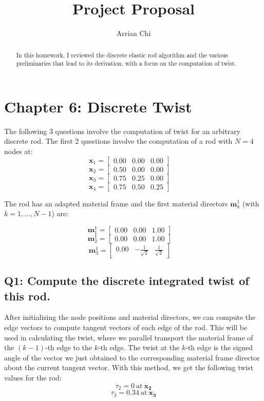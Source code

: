 \documentclass[letterpaper, 10 pt, conference]{ieeeconf}  %
\title{\LARGE \bf
Project Proposal 
}
\author{Arrian Chi%
}
\begin{document}
\onecolumn


\maketitle
\thispagestyle{empty}
\pagestyle{empty}



\begin{abstract}

In this homework, I reviewed the discrete elastic rod algorithm and the various preliminaries that lead to its derivation, with a focus on the computation of twist. 

\end{abstract}
\section{Chapter 6: Discrete Twist}
The following 3 questions involve the computation of twist for an arbitrary discrete rod. The first 2 questions involve the computation of a rod with $ N = 4 $ nodes at:
\[ \mathbf{x}_1 = \begin{bmatrix} 0.00 & 0.00 & 0.00 \end{bmatrix} \quad \]
\[ \mathbf{x}_2 = \begin{bmatrix} 0.50 & 0.00 & 0.00 \end{bmatrix} \quad \]
\[ \mathbf{x}_3 = \begin{bmatrix} 0.75 & 0.25 & 0.00 \end{bmatrix} \quad \]
\[ \mathbf{x}_4 = \begin{bmatrix} 0.75 & 0.50 & 0.25 \end{bmatrix} \quad \]


The rod has an adapted material frame and the first material directors \( \mathbf{m}_k^1 \) (with \( k = 1, \ldots, N-1 \)) are:


\[\mathbf{m}_1^1 = \begin{bmatrix} 0.00 & 0.00 & 1.00 \end{bmatrix} \quad \]
\[\mathbf{m}_2^1 = \begin{bmatrix} 0.00 & 0.00 & 1.00 \end{bmatrix} \quad \]
\[\mathbf{m}_3^1 = \begin{bmatrix} 0.00 & -\frac{1}{\sqrt{2}} & \frac{1}{\sqrt{2}} \end{bmatrix} \quad \]


\subsection*{Q1: Compute the discrete integrated twist of this rod.}
After initializing the node positions and material directors, we can compute the edge vectors to compute tangent vectors of each edge of the rod. This will be used in calculating the twist, where we parallel transport the material frame of the $(k -1)$-th edge to the $k$-th edge. The twist at the $k$-th edge is the signed angle of the vector we just obtained to the corresponding material frame director about the current tangent vector. With this method, we get the following twist values for the rod:
\[ \tau_2 = 0 \ \text{at} \ \mathbf{x_2}\]
\[\tau_3 = 0.34\ \text{at} \ \mathbf{x_3} \]
\end{document}
